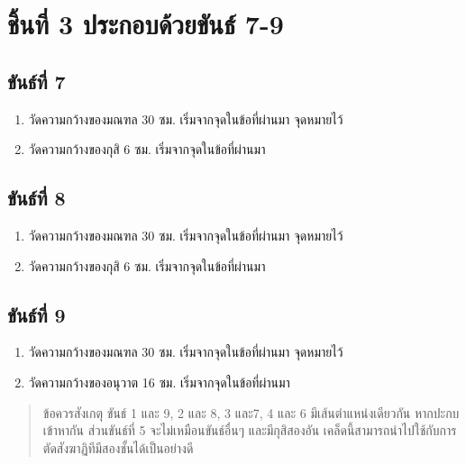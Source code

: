 \section{ชิ้นที่ 3 ประกอบด้วยขันธ์ 7-9}

\subsection{ขันธ์ที่ 7}

\begin{enumerate}
\def\labelenumi{(\arabic{enumi})}
\item
  วัดความกว้างของมณฑล 30 ซม. เริ่มจากจุดในข้อที่ผ่านมา จุดหมายไว้
\item
  วัดความกว้างของกุสิ 6 ซม. เริ่มจากจุดในข้อที่ผ่านมา
\end{enumerate}

\subsection{ขันธ์ที่ 8}

\begin{enumerate}
\def\labelenumi{(\arabic{enumi})}
\item
  วัดความกว้างของมณฑล 30 ซม. เริ่มจากจุดในข้อที่ผ่านมา จุดหมายไว้
\item
  วัดความกว้างของกุสิ 6 ซม. เริ่มจากจุดในข้อที่ผ่านมา
\end{enumerate}

\subsection{ขันธ์ที่ 9}

\begin{enumerate}
\def\labelenumi{(\arabic{enumi})}
\item
  วัดความกว้างของมณฑล 30 ซม. เริ่มจากจุดในข้อที่ผ่านมา จุดหมายไว้
\item
  วัดความกว้างของอนุวาต 16 ซม. เริ่มจากจุดในข้อที่ผ่านมา
\end{enumerate}

\begin{quote}
ข้อควรสังเกตุ ขันธ์ 1 และ 9, 2 และ 8, 3 และ7, 4 และ 6
มีเส้นตำแหน่งเดียวกัน หากปะกบเข้าหากัน ส่วนขันธ์ที่ 5
จะไม่เหมือนขันธ์อื่นๆ และมีกุสิสองอัน
เคล็ดนี้สามารถนำไปใช้กับการตัดสังฆาฏิทีมีสองชั้นได้เป็นอย่างดี
\end{quote}

